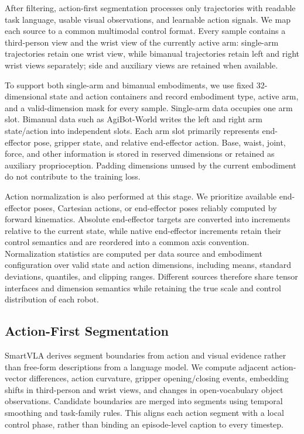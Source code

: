 After filtering, action-first segmentation processes only trajectories
with readable task language, usable visual observations, and learnable
action signals. We map each source to a common multimodal control
format. Every sample contains a third-person view and the wrist view of
the currently active arm: single-arm trajectories retain one wrist view,
while bimanual trajectories retain left and right wrist views
separately; side and auxiliary views are retained when available.

To support both single-arm and bimanual embodiments, we use fixed
32-dimensional state and action containers and record embodiment type,
active arm, and a valid-dimension mask for every sample. Single-arm data
occupies one arm slot. Bimanual data such as AgiBot-World writes the
left and right arm state/action into independent slots. Each arm slot
primarily represents end-effector pose, gripper state, and relative
end-effector action. Base, waist, joint, force, and other information is
stored in reserved dimensions or retained as auxiliary proprioception.
Padding dimensions unused by the current embodiment do not contribute to
the training loss.

Action normalization is also performed at this stage. We prioritize
available end-effector poses, Cartesian actions, or end-effector poses
reliably computed by forward kinematics. Absolute end-effector targets
are converted into increments relative to the current state, while
native end-effector increments retain their control semantics and are
reordered into a common axis convention. Normalization statistics are
computed per data source and embodiment configuration over valid state
and action dimensions, including means, standard deviations, quantiles,
and clipping ranges. Different sources therefore share tensor interfaces
and dimension semantics while retaining the true scale and control
distribution of each robot.

\hypertarget{action-first-segmentation}{%
\subsection{Action-First Segmentation}\label{action-first-segmentation}}

SmartVLA derives segment boundaries from action and visual evidence
rather than free-form descriptions from a language model. We compute
adjacent action-vector differences, action curvature, gripper
opening/closing events, embedding shifts in third-person and wrist
views, and changes in open-vocabulary object observations. Candidate
boundaries are merged into segments using temporal smoothing and
task-family rules. This aligns each action segment with a local control
phase, rather than binding an episode-level caption to every timestep.

